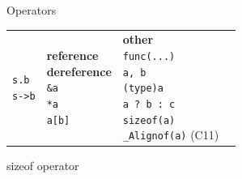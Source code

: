 \begin{frame}{Operators}
{\begin{tabular}{llll}
{                \texttt{s.b}                     \\
                \texttt{s->b}                    \\
            } &
            \specialcell{\textbf{reference} \\ \textbf{dereference}  \\
                \texttt{\&a}                     \\
                \texttt{*a}                      \\
                \texttt{a[b]}                    \\
            } &
            \specialcell{\textbf{other}          \\
                \texttt{func(...)}               \\
                \texttt{a, b}                    \\
                \texttt{(type)a}                 \\
                \texttt{a ? b : c}               \\
                \texttt{sizeof(a)}               \\
                \texttt{\_Alignof(a)} (C11)      \\
            } \\
        \end{tabular}
    }
\end{frame}
\begin{frame}{sizeof operator}
    
\end{frame}
